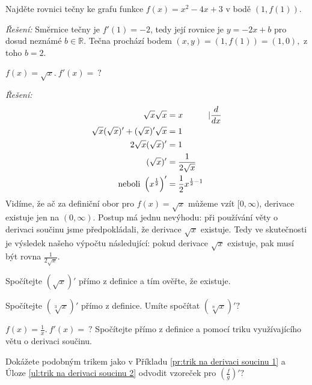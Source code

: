 \begin{příklad}
  Najděte rovnici tečny ke grafu funkce $f(x)=x^{2}-4x+3$ v bodě $(1,f(1))$.\par
\textit{Řešení:} Směrnice tečny je $f'(1)=-2$, tedy její rovnice je $y=-2x+b$ pro dosud neznámé $b\in \mathbb{R}.$ Tečna prochází bodem $(x,y)=(1,f(1))=(1,0),$ z toho $b=2.$
\end{příklad}
\begin{příklad}\label{pr:trik na derivaci soucinu 1}
  $f(x)=\sqrt{x}.\ f'(x)=\ ?$\par
\textit{Řešení:}
\begin{align*}
	\sqrt{x}\sqrt{x}   &= x \hspace{3em} \rvert \frac{d}{dx} \\
	\sqrt{x}(\sqrt{x})'+(\sqrt{x})'\sqrt{x} &= 1 \\
	2 \sqrt{x} (\sqrt{x})' &= 1 \\
	(\sqrt{x})' &= \frac{1}{2 \sqrt{x}} \\
	\textnormal{neboli } \left(x^{\frac{1}{2}}\right)' &= \frac{1}{2}x^{\frac{1}{2}-1}
\end{align*}
Vidíme, že ač za definiční obor pro $f(x)=\sqrt{x}$ můžeme vzít $[0,\infty)$, derivace existuje jen na $(0,\infty).$ Postup má jednu nevýhodu: při používání věty o derivaci součinu jsme předpokládali, že derivace $\sqrt{x}$ existuje. Tedy ve skutečnosti je výsledek našeho výpočtu následující: pokud derivace $\sqrt{x}$ existuje, pak musí být rovna $\frac{1}{2 \sqrt{x}}.$
\end{příklad}

\begin{úloha}
  Spočítejte $(\sqrt{x})'$ přímo z definice a tím ověřte, že existuje.
\end{úloha}

\begin{úloha}
	Spočítejte $(\sqrt[3]{x})'$ přímo z definice. Umíte spočítat $(\sqrt[n]{x})'?$
\end{úloha}

\begin{úloha}\label{ul:trik na derivaci soucinu 2}
  $f(x)=\frac{1}{x}.\ f'(x)=\ ?$ Spočítejte přímo z definice a pomocí triku využívajícího větu o derivaci součinu.
\end{úloha}

\begin{úloha}	Dokážete podobným trikem jako v Příkladu \ref{pr:trik na derivaci soucinu 1} a Úloze \ref{ul:trik na derivaci soucinu 2} odvodit vzoreček pro $\left(\frac{f}{g}\right)'?$
\end{úloha}

